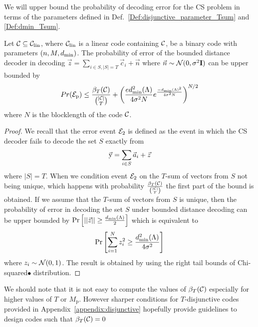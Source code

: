 We will upper bound the probability of decoding error for the CS problem in terms of the parameters defined in Def.~\ref{Def:disjunctive_parameter_Tsum} and \ref{Def:dmin_Tsum}.
\begin{lemma}
Let $\mathcal{C}\subseteq \mathcal{C}_{\text{lin}}$, where $\mathcal{C}_{\text{lin}}$ is a linear code containing $\mathcal{C}$, be a binary code with parameters $(n,M,d_{\mathrm{min}})$. The probability of error of the bounded distance decoder in decoding $\vec{z}=\sum_{i\in S,|S|= T}\vec{c}_i+\vec{n}$ where $\vec{n}\sim \mathcal{N}(0,\sigma^2 \mathbf{I})$ can be upper bounded by
\[
Pr(\mathcal{E}_{\mathrm{p}})\leq \frac{\beta_T(\mathcal{C})}{\binom{|\mathcal{C}|}{T}}+ \left(\frac{ed_{\mathrm{min}}^2(\Lambda)}{4\sigma^2 N}e^{\frac{-d_{\mathrm{min}}(\Lambda)^2}{4\sigma^2 N}}\right)^{N/2}
\]
where $N$ is the blocklength of the code $\mathcal{C}$.
\label{Lem:CS_UpperBound}
\end{lemma}
\begin{proof}
We recall that the error event $\mathcal{E}_2$ is defined as the event in which the CS decoder fails to decode the set $S$ exactly from
\[
\vec{\mathrm{y}}=\sum_{i\in S}\vec{a}_i+\vec{z}
\]
where $|S|=T$. When we condition event $\mathcal{E}_2$ on the $T$-sum of vectors from $S$ not being unique, which happens with probability $\frac{\beta_T(\mathcal{C})}{\binom{|\mathcal{C}|}{T}}$ the first part of the bound is obtained. If we assume that the $T$-sum of vectors from $S$ is unique, then the probability of error in decoding the set $S$ under bounded distance decoding can be upper bounded by  $\mathrm{Pr} \left[\left|\left|\vec{z}\right|\right|\geq \frac{d_{\mathrm{min}}(\Lambda)}{2}\right]$ which is equivalent to
\begin{align*}
 \mathrm{Pr}\left[ \sum_{i=1}^{N}z^2_i \geq \frac{d_{\mathrm{min}}^2(\Lambda)}{4\sigma^2}\right]
\end{align*}
where $z_i\sim \mathcal{N}(0,1)$. The result is obtained by using the right tail bounds of Chi-squared$•$ distribution.
\end{proof}

We should note that it is not easy to compute the values of $\beta_T(\mathcal{C})$ especially for higher values of $T$ or $M_\mathrm{p}$. However sharper conditions for $T$-disjunctive codes provided in Appendix~\ref{appendix:disjunctive} hopefully provide guidelines to design codes such that $\beta_T(\mathcal{C})=0$
